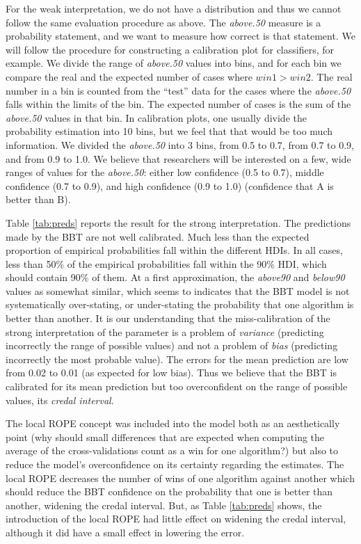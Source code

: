 \documentclass[twoside,11pt,preprint]{article}
\begin{document}
For the weak interpretation, we do not have a distribution and thus we
cannot follow the same evaluation procedure as above. The {\em above.50}
measure is a probability statement, and we want to measure how correct
is that statement. We will follow the procedure for constructing a
calibration plot for classifiers, for example. We divide the range of {\em above.50} values into bins,
and for each bin we compare the real and the expected number of cases
where \(win1 > win2\). The real number in a bin is counted from the ``test'' data
for the cases where the {\em above.50} falls within the limits of the
bin. The expected number of cases is the sum of the {\em above.50} values in
that bin. In calibration plots, one usually divide the probability
estimation into 10 bins, but we feel that that would be too much
information. We divided the {\em above.50} into 3 bins, from 0.5 to 0.7,
from 0.7 to 0.9, and from 0.9 to 1.0. We believe that researchers will
be interested on a few, wide ranges of values for the {\em above.50}: either
low confidence (0.5 to 0.7), middle confidence (0.7 to 0.9), and high
confidence (0.9 to 1.0) (confidence that A is better than B).

Table \ref{tab:preds} reports the result for the strong
interpretation. The predictions made by the BBT are not well
calibrated. Much less than the expected proportion of empirical
probabilities fall within the different HDIs. In all cases, less
than 50\% of the empirical probabilities fall within the 90\% HDI, which
should contain 90\% of them. At a first approximation, the {\em above90} and
{\em below90} values as somewhat similar, which seems to indicates that the
BBT model is not systematically over-stating, or under-stating the
probability that one algorithm is better than another. It is our understanding that the miss-calibration of the strong interpretation of the parameter is a problem of \emph{variance} (predicting incorrectly the range of possible values) and not a problem of \emph{bias} (predicting incorrectly the most probable value). The errors for the mean prediction are low from 0.02 to 0.01 (as expected for low bias). Thus we believe that the BBT is calibrated for its mean prediction but too overconfident on the range of possible values, its \emph{credal interval}.

The local ROPE concept was included into the model both as an
aesthetically point (why should small differences that are expected
when computing the average of the cross-validations count as a
win for one algorithm?) but also to reduce the model's overconfidence
on its certainty regarding the estimates. The local ROPE decreases the number of wins of one
algorithm against another which should reduce the BBT confidence on
the probability that one is better than another, widening the credal
interval. But, as Table \ref{tab:preds} shows, the introduction of the local ROPE had little effect on
widening the credal interval, although it did have a small effect in lowering the error.
\end{document}
